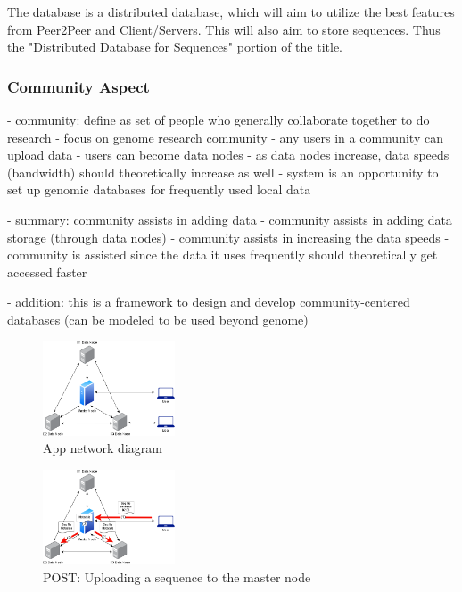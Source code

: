 \documentclass[acmsmall]{acmart}
\begin{document}
The database is a distributed database, which will aim to utilize the best features from Peer2Peer and Client/Servers. This will also aim to store sequences. Thus the "Distributed Database for Sequences" portion of the title.

\subsubsection{Community Aspect}
- community: define as set of people who generally collaborate together to do research
- focus on genome research community
- any users in a community can upload data
- users can become data nodes
- as data nodes increase, data speeds (bandwidth) should theoretically increase as well
- system is an opportunity to set up genomic databases for frequently used local data

- summary: community assists in adding data
- community assists in adding data storage (through data nodes)
- community assists in increasing the data speeds
- community is assisted since the data it uses frequently should theoretically get accessed faster

- addition: this is a framework to design and develop community-centered databases (can be modeled to be used beyond genome)



\begin{figure}[h]
\caption{App network diagram}
\centering
\includegraphics[width=0.35\textwidth]{images/thesis1.png} 
\end{figure}

\begin{figure}[h]
\caption{POST: Uploading a sequence to the master node}
\centering
\includegraphics[width=0.35\textwidth]{images/thesis3.png} 
\end{figure}
\end{document}
